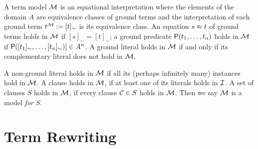 \begin{definition}\label{def:termmodel}
	A {\myem term model} ${\mathcal M}$ is an equational interpretation where the elements of the domain $A$ 
	are equivalence classes of ground terms
	and the interpretation of each ground term $t^{\mathcal M} := [t]_\sim$ is its equivalence class.
	An equation $s\approx t$ of ground terms holds in ${\mathcal M}$ if $[s]_\sim=[t]_\sim$;
	a ground predicate ${\mathsf P}(t_1,\ldots,t_n)$ holds in ${\mathcal M}$ if ${\mathsf P}([t_1]_\sim,\ldots,[t_n]_\sim)] \in A^n$.
	A ground literal holds in ${\mathcal M}$ if and only if its complementary literal does not hold in ${\mathcal M}$.
	
	A non-ground literal holds in ${\mathcal M}$ if all its 
	(perhaps infinitely many)
	instances hold in ${\mathcal M}$.
	A clause holds in ${\mathcal M}$, if at least one of its literals holds in ${\mathcal I}$.
	A set of clauses $S$ holds in ${\mathcal M}$, if every clause ${\mathcal C}\in S$ holds in ${\mathcal M}$.
	Then we say ${\mathcal M}$ is a model {\em for} $S$.
	
\end{definition}

\section{Term Rewriting}

